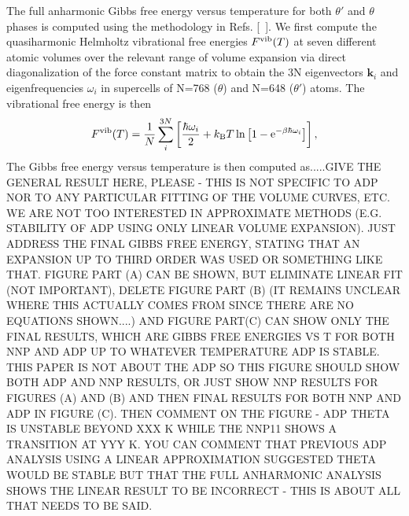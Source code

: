 \documentclass{article}
\begin{document}
The full anharmonic Gibbs free energy versus temperature for both $\theta'$ and $\theta$ phases is computed using the methodology in Refs. [~\cite{Grabowski2009,Glensk2015,Glensk2015b}]. We first compute the quasiharmonic Helmholtz vibrational free energies $F^{\rm vib}(T)$ at seven different atomic volumes over the relevant range of volume expansion via direct diagonalization of the force constant matrix to obtain the 3N eigenvectors $\mathbf{k}_i$ and eigenfrequencies $\omega_{i}$ in supercells of N=768 ($\theta$) and N=648 ($\theta'$) atoms.  The vibrational free energy is then
\begin{equation}
    F^{\rm vib}(T) = \frac{1}{N} \sum_{i}^{3N} \left[\frac{\hbar\omega_{i}}{2} + k_{\rm B} T \ln\left[1-\mathrm{e}^{- \beta \hbar\omega_{i}}\right]\right],
    \label{Fqh3}
\end{equation}
The Gibbs free energy versus temperature is then computed as.....GIVE THE GENERAL RESULT HERE, PLEASE - THIS IS NOT SPECIFIC TO ADP NOR TO ANY PARTICULAR FITTING OF THE VOLUME CURVES, ETC.  WE ARE NOT TOO INTERESTED IN APPROXIMATE METHODS (E.G. STABILITY OF ADP USING ONLY LINEAR VOLUME EXPANSION).  JUST ADDRESS THE FINAL GIBBS FREE ENERGY, STATING THAT AN EXPANSION UP TO THIRD ORDER WAS USED OR SOMETHING LIKE THAT.  FIGURE PART (A) CAN BE SHOWN, BUT ELIMINATE LINEAR FIT (NOT IMPORTANT), DELETE FIGURE PART (B) (IT REMAINS UNCLEAR WHERE THIS ACTUALLY COMES FROM SINCE THERE ARE NO EQUATIONS SHOWN....) AND FIGURE PART(C) CAN SHOW ONLY THE FINAL RESULTS, WHICH ARE GIBBS FREE ENERGIES VS T FOR BOTH NNP AND ADP UP TO WHATEVER TEMPERATURE ADP IS STABLE.  THIS PAPER IS NOT ABOUT THE ADP SO THIS FIGURE SHOULD SHOW BOTH ADP AND NNP RESULTS, OR JUST SHOW NNP RESULTS FOR FIGURES (A) AND (B) AND THEN FINAL RESULTS FOR BOTH NNP AND ADP IN FIGURE (C).  THEN COMMENT ON THE FIGURE - ADP THETA IS UNSTABLE BEYOND XXX K WHILE THE NNP11 SHOWS A TRANSITION AT YYY K.
YOU CAN COMMENT THAT PREVIOUS ADP ANALYSIS USING A LINEAR APPROXIMATION SUGGESTED THETA WOULD BE STABLE BUT THAT THE FULL ANHARMONIC ANALYSIS SHOWS THE LINEAR RESULT TO BE INCORRECT - THIS IS ABOUT ALL THAT NEEDS TO BE SAID.
\end{document}
